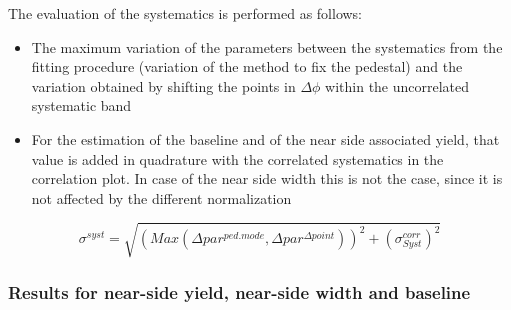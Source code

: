 \begin{comment}
\label{fig:dstarfinaldphifitted}
\end{figure}

\begin{figure}
\centering
\caption{Final plot: average of $\Dzero$ and $\Dstar$ correlation, including only the uncorrelated systematics and the fitted function, with  $3 < D\ p_\text{T} < 5$ GeV/$c$, $5 < D\ p_\text{T} < 8$ GeV/$c$ and $8 < D\ p_\text{T} < 16$ GeV/$c$, while the associated tracks are selected with $p_{T}^{assoc}>0.3  GeV/c $. The  plot with $3 < D\ p_\text{T} < 5$ GeV/c is not considered in the final plots, due to the discrepancy between $\Dzero$ and $\Dstar$ }

\label{fig:averagefinaldphifitted}
\end{figure}

\end{comment}

The evaluation of the systematics is performed as follows:

\begin{itemize}
\item The maximum variation of the parameters between the systematics from the fitting procedure (variation of the method to fix the pedestal) and the variation obtained by shifting the points in $\Delta\phi$ within the uncorrelated systematic band
\item For the estimation of the baseline and of the near side associated yield, that value is added in quadrature with the correlated systematics in the correlation plot. In case of the near side width this is not the case, since it is not affected by the different normalization
\end{itemize}

\begin{equation}
\sigma^{syst} = \sqrt{\left(Max\left(\Delta par^{ped.mode},\Delta par^{\Delta point}\right)\right)^{2} + (\sigma_{Syst}^{corr})^{2}}
\end{equation}

\subsubsection{Results for near-side yield, near-side width and baseline}

